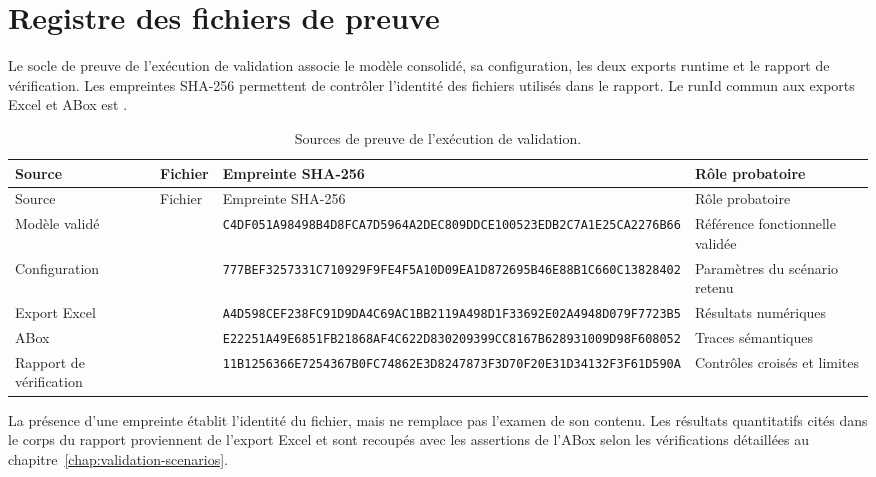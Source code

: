 \chapter{Registre des fichiers de preuve}
\label{ann:fichiers-preuve}

Le socle de preuve de l'exécution de validation associe le modèle consolidé, sa configuration, les deux exports runtime et le rapport de vérification. Les empreintes SHA-256 permettent de contrôler l'identité des fichiers utilisés dans le rapport. Le runId commun aux exports Excel et ABox est .

\begin{longtable}{@{}L{0.14\textwidth}L{0.27\textwidth}L{0.33\textwidth}L{0.18\textwidth}@{}}
\caption{Sources de preuve de l'exécution de validation.}\label{tab:registre-preuves}\\
\toprule
Source & Fichier & Empreinte SHA-256 & Rôle probatoire \\
\midrule
\endfirsthead
\toprule
Source & Fichier & Empreinte SHA-256 & Rôle probatoire \\
\midrule
\endhead
\bottomrule
\endfoot
Modèle validé &  & {\scriptsize\texttt{C4DF051A98498B4D8FCA7D5964A2DEC8}\allowbreak\texttt{09DDCE100523EDB2C7A1E25CA2276B66}} & Référence fonctionnelle validée \\
Configuration &  & {\scriptsize\texttt{777BEF3257331C710929F9FE4F5A10D0}\allowbreak\texttt{9EA1D872695B46E88B1C660C13828402}} & Paramètres du scénario retenu \\
Export Excel &  & {\scriptsize\texttt{A4D598CEF238FC91D9DA4C69AC1BB211}\allowbreak\texttt{9A498D1F33692E02A4948D079F7723B5}} & Résultats numériques \\
ABox &  & {\scriptsize\texttt{E22251A49E6851FB21868AF4C622D830}\allowbreak\texttt{209399CC8167B628931009D98F608052}} & Traces sémantiques \\
Rapport de vérification &  & {\scriptsize\texttt{11B1256366E7254367B0FC74862E3D824}\allowbreak\texttt{7873F3D70F20E31D34132F3F61D590A}} & Contrôles croisés et limites \\
\end{longtable}

La présence d'une empreinte établit l'identité du fichier, mais ne remplace pas l'examen de son contenu. Les résultats quantitatifs cités dans le corps du rapport proviennent de l'export Excel et sont recoupés avec les assertions de l'ABox selon les vérifications détaillées au chapitre~\ref{chap:validation-scenarios}.
